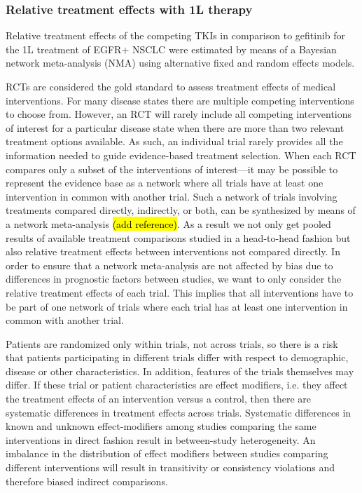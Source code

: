 \documentclass[11pt,final,fleqn]{article}\usepackage[]{graphicx}\usepackage[]{color}
\theoremstyle{plain}
\begin{document}
{\subsubsection{Relative treatment effects with 1L therapy}
Relative treatment effects of the competing TKIs in comparison to gefitinib for the 1L treatment of EGFR+ NSCLC were estimated by means of a Bayesian network meta-analysis (NMA) using alternative fixed and random effects models. 

RCTs are considered the gold standard to assess treatment effects of medical interventions. For many disease states there are multiple competing interventions to choose from. However, an RCT will rarely include all competing interventions of interest for a particular disease state when there are more than two relevant treatment options available. As such, an individual trial rarely provides all the information needed to guide evidence-based treatment selection. When each RCT compares only a subset of the interventions of interest---it may be possible to represent the evidence base as a network where all trials have at least one intervention in common with another trial. Such a network of trials involving treatments compared directly, indirectly, or both, can be synthesized by means of a network meta-analysis \hl{(add reference)}. As a result we not only get pooled results of available treatment comparisons studied in a head-to-head fashion but also relative treatment effects between interventions not compared directly. In order to ensure that a network meta-analysis are not affected by bias due to differences in prognostic factors between studies, we want to only consider the relative treatment effects of each trial. This implies that all interventions have to be part of one network of trials where each trial has at least one intervention in common with another trial.  

Patients are randomized only within trials, not across trials, so there is a risk that patients participating in different trials differ with respect to demographic, disease or other characteristics. In addition, features of the trials themselves may differ. If these trial or patient characteristics are effect modifiers, i.e. they affect the treatment effects of an intervention versus a control, then there are systematic differences in treatment effects across trials. Systematic differences in known and unknown effect-modifiers among studies comparing the same interventions in direct fashion result in between-study heterogeneity. An imbalance in the distribution of effect modifiers between studies comparing different interventions will result in transitivity or consistency violations and therefore biased indirect comparisons.

}
\end{document}

